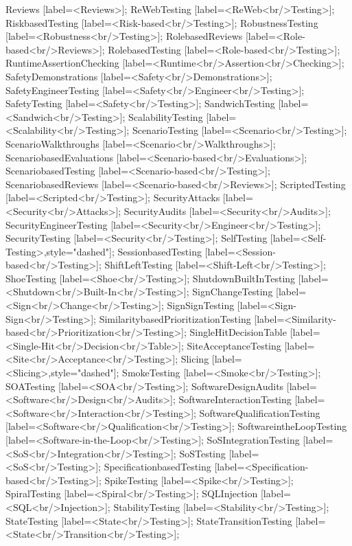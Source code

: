 \documentclass{article}
\begin{document}
{Reviews [label=<Reviews>];
ReWebTesting [label=<ReWeb<br/>Testing>];
RiskbasedTesting [label=<Risk-based<br/>Testing>];
RobustnessTesting [label=<Robustness<br/>Testing>];
RolebasedReviews [label=<Role-based<br/>Reviews>];
RolebasedTesting [label=<Role-based<br/>Testing>];
RuntimeAssertionChecking [label=<Runtime<br/>Assertion<br/>Checking>];
SafetyDemonstrations [label=<Safety<br/>Demonstrations>];
SafetyEngineerTesting [label=<Safety<br/>Engineer<br/>Testing>];
SafetyTesting [label=<Safety<br/>Testing>];
SandwichTesting [label=<Sandwich<br/>Testing>];
ScalabilityTesting [label=<Scalability<br/>Testing>];
ScenarioTesting [label=<Scenario<br/>Testing>];
ScenarioWalkthroughs [label=<Scenario<br/>Walkthroughs>];
ScenariobasedEvaluations [label=<Scenario-based<br/>Evaluations>];
ScenariobasedTesting [label=<Scenario-based<br/>Testing>];
ScenariobasedReviews [label=<Scenario-based<br/>Reviews>];
ScriptedTesting [label=<Scripted<br/>Testing>];
SecurityAttacks [label=<Security<br/>Attacks>];
SecurityAudits [label=<Security<br/>Audits>];
SecurityEngineerTesting [label=<Security<br/>Engineer<br/>Testing>];
SecurityTesting [label=<Security<br/>Testing>];
SelfTesting [label=<Self-Testing>,style="dashed"];
SessionbasedTesting [label=<Session-based<br/>Testing>];
ShiftLeftTesting [label=<Shift-Left<br/>Testing>];
ShoeTesting [label=<Shoe<br/>Testing>];
ShutdownBuiltInTesting [label=<Shutdown<br/>Built-In<br/>Testing>];
SignChangeTesting [label=<Sign<br/>Change<br/>Testing>];
SignSignTesting [label=<Sign-Sign<br/>Testing>];
SimilaritybasedPrioritizationTesting [label=<Similarity-based<br/>Prioritization<br/>Testing>];
SingleHitDecisionTable [label=<Single-Hit<br/>Decision<br/>Table>];
SiteAcceptanceTesting [label=<Site<br/>Acceptance<br/>Testing>];
Slicing [label=<Slicing>,style="dashed"];
SmokeTesting [label=<Smoke<br/>Testing>];
SOATesting [label=<SOA<br/>Testing>];
SoftwareDesignAudits [label=<Software<br/>Design<br/>Audits>];
SoftwareInteractionTesting [label=<Software<br/>Interaction<br/>Testing>];
SoftwareQualificationTesting [label=<Software<br/>Qualification<br/>Testing>];
SoftwareintheLoopTesting [label=<Software-in-the-Loop<br/>Testing>];
SoSIntegrationTesting [label=<SoS<br/>Integration<br/>Testing>];
SoSTesting [label=<SoS<br/>Testing>];
SpecificationbasedTesting [label=<Specification-based<br/>Testing>];
SpikeTesting [label=<Spike<br/>Testing>];
SpiralTesting [label=<Spiral<br/>Testing>];
SQLInjection [label=<SQL<br/>Injection>];
StabilityTesting [label=<Stability<br/>Testing>];
StateTesting [label=<State<br/>Testing>];
StateTransitionTesting [label=<State<br/>Transition<br/>Testing>];
}
\end{document}
